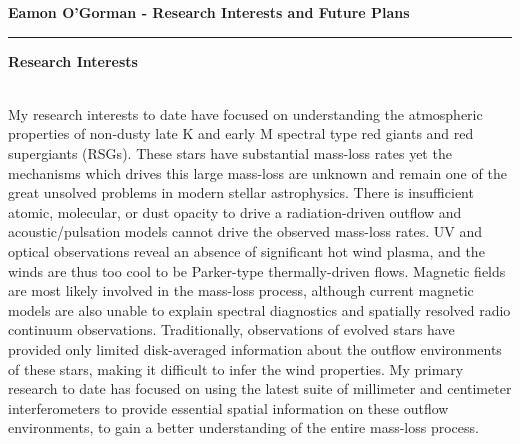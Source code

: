 \documentclass[11pt]{letter} %
\begin{document}




\begin{flushleft}
{\large\bf Eamon O'Gorman - Research Interests and Future Plans}
\end{flushleft}
\medskip\hrule height 1pt
\begin{flushright}


\end{flushright} 
\begin{center}
\textbf{Research Interests}
\end{center}\\
My research interests to date have focused on understanding the atmospheric properties of non-dusty late K and early M spectral type red giants and red supergiants (RSGs). These stars have substantial mass-loss rates yet the mechanisms which drives this large mass-loss are unknown and remain one of the great unsolved problems in modern stellar astrophysics. There is insufficient atomic, molecular, or dust opacity to drive a radiation-driven outflow and acoustic/pulsation models cannot drive the observed mass-loss rates. UV and optical observations reveal an absence of significant hot wind plasma, and the winds are thus too cool to be Parker-type thermally-driven flows. Magnetic fields are most likely involved in the mass-loss process, although current magnetic models are also unable to explain spectral diagnostics and spatially resolved radio continuum observations. Traditionally, observations of evolved stars have provided only limited disk-averaged information about the outflow environments of these stars, making it difficult to infer the wind properties. My primary research to date has focused on using the latest suite of millimeter and centimeter interferometers to provide essential spatial information on these outflow environments, to gain a better understanding of the entire mass-loss process.
\end{document}
